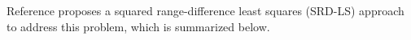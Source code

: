 Reference \cite{BeckStLi} proposes a squared range-difference least squares (SRD-LS) approach to address this problem, which is summarized below.

